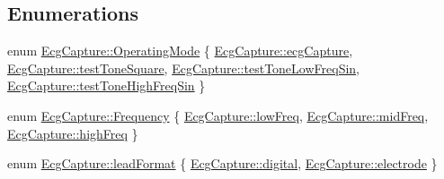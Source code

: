 \subsection*{Enumerations}
\begin{DoxyCompactItemize}
\item 
enum \hyperlink{group__Device-Facade_gabf6e5cc9109a573e29add762dc36df9b}{Ecg\+Capture\+::\+Operating\+Mode} \{ \hyperlink{group__Device-Facade_ggabf6e5cc9109a573e29add762dc36df9ba9e4c8f425af52209ee3eb7c466852b22}{Ecg\+Capture\+::ecg\+Capture}, 
\hyperlink{group__Device-Facade_ggabf6e5cc9109a573e29add762dc36df9ba8b349f0786d8e8247f4bc381baa51134}{Ecg\+Capture\+::test\+Tone\+Square}, 
\hyperlink{group__Device-Facade_ggabf6e5cc9109a573e29add762dc36df9ba9ececd6d5264a0e5996556c6697a4f94}{Ecg\+Capture\+::test\+Tone\+Low\+Freq\+Sin}, 
\hyperlink{group__Device-Facade_ggabf6e5cc9109a573e29add762dc36df9ba397d60b89ddb5aaf41d92c617868ed47}{Ecg\+Capture\+::test\+Tone\+High\+Freq\+Sin}
 \}
\item 
enum \hyperlink{group__Device-Facade_gaaf4f7677ca26944edc0f65195b8729f3}{Ecg\+Capture\+::\+Frequency} \{ \hyperlink{group__Device-Facade_ggaaf4f7677ca26944edc0f65195b8729f3acb281025a93800e7ed188605a7375838}{Ecg\+Capture\+::low\+Freq}, 
\hyperlink{group__Device-Facade_ggaaf4f7677ca26944edc0f65195b8729f3a2a968734e734a271ef5a52b83360122a}{Ecg\+Capture\+::mid\+Freq}, 
\hyperlink{group__Device-Facade_ggaaf4f7677ca26944edc0f65195b8729f3abd09d184c2c34f227532a8bc5fb90877}{Ecg\+Capture\+::high\+Freq}
 \}
\item 
enum \hyperlink{group__Device-Facade_ga1750ac59389b67ba4d9d2834dd7c2d9c}{Ecg\+Capture\+::lead\+Format} \{ \hyperlink{group__Device-Facade_gga1750ac59389b67ba4d9d2834dd7c2d9caf7786dce131009aa61ddfed4f8d8639b}{Ecg\+Capture\+::digital}, 
\hyperlink{group__Device-Facade_gga1750ac59389b67ba4d9d2834dd7c2d9ca21cabce4f74afcf79d24897058fdd6b9}{Ecg\+Capture\+::electrode}
 \}
\end{DoxyCompactItemize}
